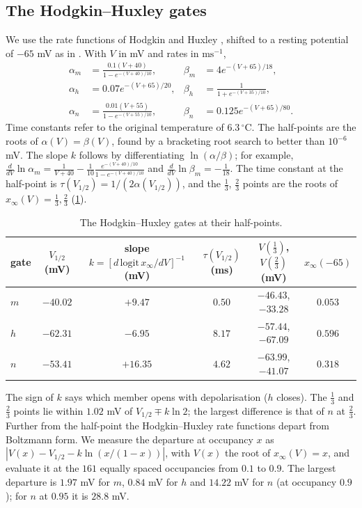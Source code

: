 \documentclass[11pt]{article}
\theoremstyle{definition}\newtheorem{definition}[theorem]{Definition}
\theoremstyle{remark}\newtheorem{remark}[theorem]{Remark}
\begin{document}
\subsection{The Hodgkin--Huxley gates}
We use the rate functions of Hodgkin and Huxley \cite{HH}, shifted to a resting potential of $-65$ mV as in \cite{DayanAbbott}. With $V$ in mV and rates in $\mathrm{ms}^{-1}$,
\begin{equation}\label{eq:hh}
\begin{aligned}
\alpha_m&=\frac{0.1(V+40)}{1-e^{-(V+40)/10}}, & \beta_m&=4e^{-(V+65)/18},\\
\alpha_h&=0.07e^{-(V+65)/20}, & \beta_h&=\frac{1}{1+e^{-(V+35)/10}},\\
\alpha_n&=\frac{0.01(V+55)}{1-e^{-(V+55)/10}}, & \beta_n&=0.125e^{-(V+65)/80}.
\end{aligned}
\end{equation}
Time constants refer to the original temperature of $6.3\,^\circ$C. The half-points are the roots of $\alpha(V)=\beta(V)$, found by a bracketing root search to better than $10^{-6}$ mV. The slope $k$ follows by differentiating $\ln(\alpha/\beta)$; for example, $\frac{d}{dV}\ln\alpha_m=\frac1{V+40}-\frac{1}{10}\frac{e^{-(V+40)/10}}{1-e^{-(V+40)/10}}$ and $\frac{d}{dV}\ln\beta_m=-\frac1{18}$. The time constant at the half-point is $\tau(V_{1/2})=1/(2\alpha(V_{1/2}))$, and the $\frac13$, $\frac23$ points are the roots of $x_\infty(V)=\frac13,\frac23$ (\cref{tab:hh}).

\begin{table}[htbp]\centering\small
\caption{The Hodgkin--Huxley gates at their half-points.}\label{tab:hh}
\begin{tabular}{@{}lccccc@{}}\toprule
gate & $V_{1/2}$ (mV) & slope $k=[d\,\mathrm{logit}\,x_\infty/dV]^{-1}$ (mV) & $\tau(V_{1/2})$ (ms) & $V(\frac13)$, $V(\frac23)$ (mV) & $x_\infty(-65)$\\\midrule
$m$ & $-40.02$ & $+9.47$ & $0.50$ & $-46.43$, $-33.28$ & $0.053$\\
$h$ & $-62.31$ & $-6.95$ & $8.17$ & $-57.44$, $-67.09$ & $0.596$\\
$n$ & $-53.41$ & $+16.35$ & $4.62$ & $-63.99$, $-41.07$ & $0.318$\\\bottomrule
\end{tabular}
\end{table}

The sign of $k$ says which member opens with depolarisation ($h$ closes). The $\frac13$ and $\frac23$ points lie within $1.02$ mV of $V_{1/2}\mp k\ln2$; the largest difference is that of $n$ at $\frac23$. Further from the half-point the Hodgkin--Huxley rate functions depart from Boltzmann form. We measure the departure at occupancy $x$ as $|V(x)-V_{1/2}-k\ln(x/(1-x))|$, with $V(x)$ the root of $x_\infty(V)=x$, and evaluate it at the $161$ equally spaced occupancies from $0.1$ to $0.9$. The largest departure is $1.97$ mV for $m$, $0.84$ mV for $h$ and $14.22$ mV for $n$ (at occupancy $0.9$); for $n$ at $0.95$ it is $28.8$ mV.
\end{document}
